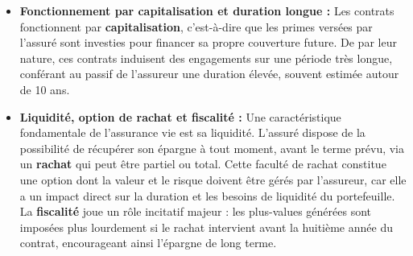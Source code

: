 \begin{itemize}
    \item \textbf{Fonctionnement par capitalisation et duration longue :} Les contrats fonctionnent par \textbf{capitalisation}, c'est-à-dire que les primes versées par l'assuré sont investies pour financer sa propre couverture future. \newline{}
    De par leur nature, ces contrats induisent des engagements sur une période très longue, conférant au passif de l'assureur une duration élevée, souvent estimée autour de 10 ans.

    \item \textbf{Liquidité, option de rachat et fiscalité :} Une caractéristique fondamentale de l'assurance vie est sa liquidité. L'assuré dispose de la possibilité de récupérer son épargne à tout moment, avant le terme prévu, via un \textbf{rachat} qui peut être partiel ou total. \newline{}
    Cette faculté de rachat constitue une option dont la valeur et le risque doivent être gérés par l'assureur, car elle a un impact direct sur la duration et les besoins de liquidité du portefeuille. \newline{}
    La \textbf{fiscalité} joue un rôle incitatif majeur : les plus-values générées sont imposées plus lourdement si le rachat intervient avant la huitième année du contrat, encourageant ainsi l'épargne de long terme.
\end{itemize}
\newpage{}
